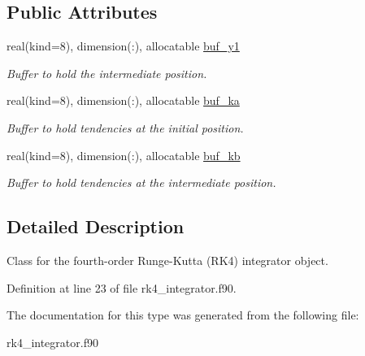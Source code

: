 \subsection*{Public Attributes}
\begin{DoxyCompactItemize}
\item 
\mbox{\label{structrk4__integrator_1_1rk4integrator_ab6027434374b421735ea1a381f76b646}} 
real(kind=8), dimension(\+:), allocatable \hyperlink{structrk4__integrator_1_1rk4integrator_ab6027434374b421735ea1a381f76b646}{buf\+\_\+y1}
\begin{DoxyCompactList}\small\item\em Buffer to hold the intermediate position. \end{DoxyCompactList}\item 
\mbox{\label{structrk4__integrator_1_1rk4integrator_a3eb9cc4c7af5d63d7ade28b61b6e1715}} 
real(kind=8), dimension(\+:), allocatable \hyperlink{structrk4__integrator_1_1rk4integrator_a3eb9cc4c7af5d63d7ade28b61b6e1715}{buf\+\_\+ka}
\begin{DoxyCompactList}\small\item\em Buffer to hold tendencies at the initial position. \end{DoxyCompactList}\item 
\mbox{\label{structrk4__integrator_1_1rk4integrator_a0de0ebc4f37a48a1ae8bff0ff48d724b}} 
real(kind=8), dimension(\+:), allocatable \hyperlink{structrk4__integrator_1_1rk4integrator_a0de0ebc4f37a48a1ae8bff0ff48d724b}{buf\+\_\+kb}
\begin{DoxyCompactList}\small\item\em Buffer to hold tendencies at the intermediate position. \end{DoxyCompactList}\end{DoxyCompactItemize}


\subsection{Detailed Description}
Class for the fourth-\/order Runge-\/\+Kutta (R\+K4) integrator object. 

Definition at line 23 of file rk4\+\_\+integrator.\+f90.



The documentation for this type was generated from the following file\+:\begin{DoxyCompactItemize}
\item 
rk4\+\_\+integrator.\+f90\end{DoxyCompactItemize}
